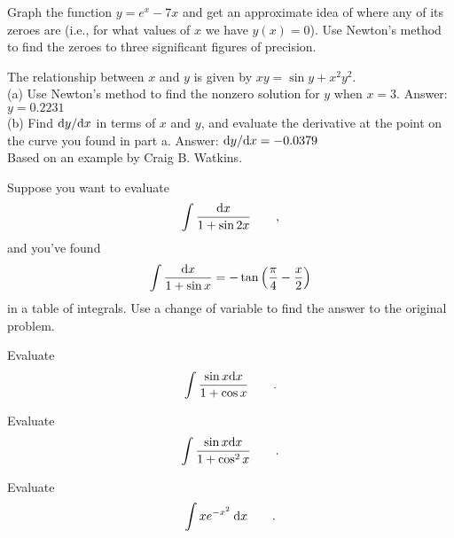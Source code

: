 
\begin{hwsection}
\begin{hw}
Graph the function $y=e^x-7x$ and get an approximate idea of where any of its zeroes
are (i.e., for what values of $x$ we have $y(x)=0$).
Use Newton's method to find the zeroes to three significant figures of precision.
\end{hw}

\begin{hw}
The relationship between $x$ and $y$ is given by $xy = \sin y+x^2y^2$.\\
(a) Use Newton's method to find the nonzero solution for $y$ when $x=3$. Answer: $y=0.2231$\\
(b) Find $\textup{d} y/\textup{d} x$ in terms of $x$ and $y$, and evaluate the derivative
at the point on the curve you found in part a. Answer: $\textup{d} y/\textup{d} x=-0.0379$\\
{\footnotesize Based on an example by Craig B. Watkins.}
\end{hw}

\begin{hw}
Suppose you want to evaluate
\begin{equation*}
  \int \frac{\textup{d} x}{1+\sin 2x} \qquad ,
\end{equation*}
and you've found
\begin{equation*}
  \int \frac{\textup{d} x}{1+\sin x} = -\tan\left(\frac{\pi}{4}-\frac{x}{2}\right)
\end{equation*}
in a table of integrals. Use a change of variable to find the answer to the
original problem.
\end{hw}

\begin{hw}
Evaluate
\begin{equation*}
  \int \frac{\sin x \textup{d} x}{1+\cos x} \qquad .
\end{equation*}
\end{hw}

\begin{hw}
Evaluate
\begin{equation*}
  \int \frac{\sin x \textup{d} x}{1+\cos^2 x} \qquad .
\end{equation*}
\end{hw}

\begin{hw}
Evaluate
\begin{equation*}
  \int x e^{-x^2} \:\textup{d} x \qquad .
\end{equation*}
\end{hw}


\end{hwsection}
